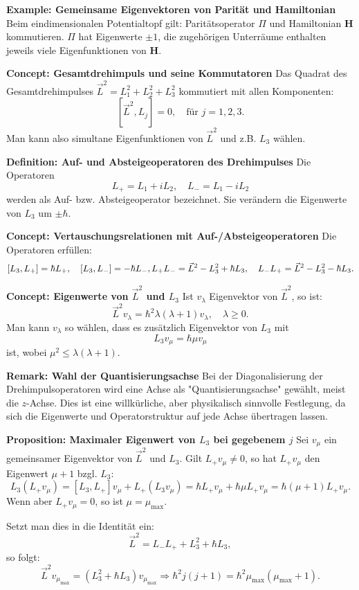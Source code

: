 \documentclass[10pt, letterpaper]{article}
\begin{document}
\textbf{Example: Gemeinsame Eigenvektoren von Parität und Hamiltonian}  
Beim eindimensionalen Potentialtopf gilt: Paritätsoperator $\Pi$ und Hamiltonian $\mathbf{H}$ kommutieren. $\Pi$ hat Eigenwerte $\pm1$, die zugehörigen Unterräume enthalten jeweils viele Eigenfunktionen von $\mathbf{H}$.



\textbf{Concept: Gesamtdrehimpuls und seine Kommutatoren}  
Das Quadrat des Gesamtdrehimpulses $\vec{L}^2 = L_1^2 + L_2^2 + L_3^2$ kommutiert mit allen Komponenten:
$$
[\vec{L}^2, L_j] = 0, \quad \text{für } j = 1, 2, 3.
$$
Man kann also simultane Eigenfunktionen von $\vec{L}^2$ und z.B. $L_3$ wählen.


\textbf{Definition: Auf- und Absteigeoperatoren des Drehimpulses}  
Die Operatoren
$$
L_+ = L_1 + i L_2, \quad L_- = L_1 - i L_2
$$
werden als Auf- bzw. Absteigeoperator bezeichnet. Sie verändern die Eigenwerte von \(L_3\) um \(\pm\hbar\).


\textbf{Concept: Vertauschungsrelationen mit Auf-/Absteigeoperatoren}  
Die Operatoren erfüllen:
$$
[L_3, L_+] = \hbar L_+, \quad [L_3, L_-] = -\hbar L_-, \\
L_+ L_- = \vec{L}^2 - L_3^2 + \hbar L_3, \quad L_- L_+ = \vec{L}^2 - L_3^2 - \hbar L_3.
$$


\textbf{Concept: Eigenwerte von \(\vec{L}^2\) und \(L_3\)}  
Ist \(v_\lambda\) Eigenvektor von \(\vec{L}^2\), so ist:
$$
\vec{L}^2 v_\lambda = \hbar^2 \lambda(\lambda + 1) v_\lambda, \quad \lambda \geq 0.
$$
Man kann \(v_\lambda\) so wählen, dass es zusätzlich Eigenvektor von \(L_3\) mit
$$
L_3 v_\mu = \hbar \mu v_\mu
$$
ist, wobei \(\mu^2 \leq \lambda(\lambda + 1)\).


\textbf{Remark: Wahl der Quantisierungsachse}  
Bei der Diagonalisierung der Drehimpulsoperatoren wird eine Achse als "Quantisierungsachse" gewählt, meist die \(z\)-Achse. Dies ist eine willkürliche, aber physikalisch sinnvolle Festlegung, da sich die Eigenwerte und Operatorstruktur auf jede Achse übertragen lassen.


\textbf{Proposition: Maximaler Eigenwert von \(L_3\) bei gegebenem \(j\)}  
Sei \(v_\mu\) ein gemeinsamer Eigenvektor von \(\vec{L}^2\) und \(L_3\). Gilt \(L_+ v_\mu \neq 0\), so hat \(L_+ v_\mu\) den Eigenwert \(\mu + 1\) bzgl. \(L_3\):
$$
L_3 (L_+ v_\mu) = [L_3, L_+] v_\mu + L_+ (L_3 v_\mu)
= \hbar L_+ v_\mu + \hbar \mu L_+ v_\mu = \hbar (\mu + 1) L_+ v_\mu.
$$
Wenn aber \(L_+ v_\mu = 0\), so ist \(\mu = \mu_{\max}\).

Setzt man dies in die Identität ein:
$$
\vec{L}^2 = L_- L_+ + L_3^2 + \hbar L_3,
$$
so folgt:
$$
\vec{L}^2 v_{\mu_{\max}} = \left(L_3^2 + \hbar L_3\right) v_{\mu_{\max}}
\Rightarrow \hbar^2 j(j+1) = \hbar^2 \mu_{\max} (\mu_{\max} + 1).
$$
\end{document}
